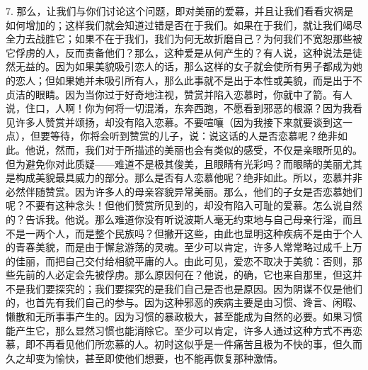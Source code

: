 7. 那么，让我们与你们讨论这个问题，即对美丽的爱慕，并且让我们看看灾祸是如何增加的；这样我们就会知道过错是否在于我们。如果在于我们，就让我们竭尽全力去战胜它；如果不在于我们，我们为何无故折磨自己？为何我们不宽恕那些被它俘虏的人，反而责备他们？那么，这种爱是从何产生的？有人说，这种说法是徒然无益的。因为如果美貌吸引恋人的话，那么这样的女子就会使所有男子都成为她的恋人；但如果她并未吸引所有人，那么此事就不是出于本性或美貌，而是出于不贞洁的眼睛。因为当你过于好奇地注视，赞赏并陷入恋慕时，你就中了箭。有人说，住口，人啊！你为何将一切混淆，东奔西跑，不愿看到邪恶的根源？因为我看见许多人赞赏并颂扬，却没有陷入恋慕。不要喧嚷（因为我接下来就要谈到这一点），但要等待，你将会听到赞赏的儿子，说：说这话的人是否恋慕呢？绝非如此。他说，然而，我们对于所描述的美丽也会有类似的感受，不仅是亲眼所见的。但为避免你对此质疑——难道不是极其俊美，且眼睛有光彩吗？而眼睛的美丽尤其是构成美貌最具威力的部分。那么是否有人恋慕他呢？绝非如此。所以，恋慕并非必然伴随赞赏。因为许多人的母亲容貌异常美丽。那么，他们的子女是否恋慕她们呢？不要有这种念头！但他们赞赏所见到的，却没有陷入可耻的爱慕。怎么说自然的？告诉我。他说。那么难道你没有听说波斯人毫无约束地与自己母亲行淫，而且不是一两个人，而是整个民族吗？但撇开这些，由此也显明这种疾病不是由于个人的青春美貌，而是由于懈怠游荡的灵魂。至少可以肯定，许多人常常略过成千上万的佳丽，而把自己交付给相貌平庸的人。由此可见，爱恋不取决于美貌：否则，那些先前的人必定会先被俘虏。那么原因何在？他说，的确，它也来自那里，但这并不是我们要探究的；我们要探究的是我们自己是否也是原因。因为阴谋不仅是他们的，也首先有我们自己的参与。因为这种邪恶的疾病主要是由习惯、谗言、闲暇、懒散和无所事事产生的。因为习惯的暴政极大，甚至能成为自然的必要。如果习惯能产生它，那么显然习惯也能消除它。至少可以肯定，许多人通过这种方式不再恋慕，即不再看见他们所恋慕的人。初时这似乎是一件痛苦且极为不快的事，但久而久之却变为愉快，甚至即使他们想要，也不能再恢复那种激情。\par

